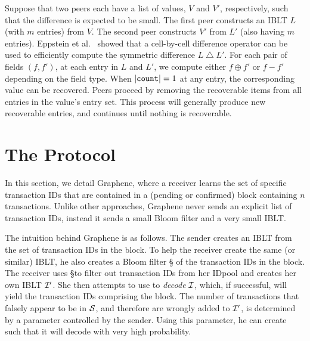 Suppose that two peers each have a list of values, $V$ and $V'$,
respectively, such that the difference is expected to be small.  The
first peer constructs an IBLT $L$ (with $m$ entries) from $V$.  The
second peer constructs $V'$ from $L'$ (also having $m$ entries).
Eppstein et al.~\cite{eppstein:2011} showed that a cell-by-cell
difference operator can be used to efficiently compute the symmetric
difference $L \bigtriangleup L'$.  For each pair of fields $(f, f')$,
at each entry in $L$ and $L'$, we compute either $f \oplus f'$ or
\mbox{$f - f'$} depending on the field type.  When
$|\mbox{\texttt{count}}| = 1$ at any entry, the corresponding
value can be recovered.  
  Peers proceed by removing the recoverable items from all entries in the value's entry set.
This process will generally produce new recoverable entries, and
continues until nothing is recoverable.
 
\section{The Protocol}
In this section, we detail Graphene,
where a receiver 
learns the set of specific transaction IDs that are contained in a
(pending or confirmed) block containing $n$ transactions. Unlike other approaches, Graphene never  sends an explicit list of transaction IDs, instead it sends  a small Bloom filter and a very small IBLT.  

The intuition behind Graphene is as follows. The sender creates an IBLT \I
from the set of transaction IDs in the block. To help the receiver
create the same (or similar) IBLT, he also creates a Bloom filter \S
 of the transaction IDs in the block. The receiver uses \S to filter out
transaction IDs from her IDpool %
and creates her own IBLT $\cal{I}'$. She then attempts to use \Ip to \emph{decode} $\cal{I}$, which, if successful, will yield
the transaction IDs comprising the block. The number of transactions
that falsely appear to be in $\cal{S}$, and therefore are wrongly added to
$\cal{I}'$, is determined by a parameter controlled by the sender. Using
this parameter, he can
create \I such that it will decode with very high probability.  

